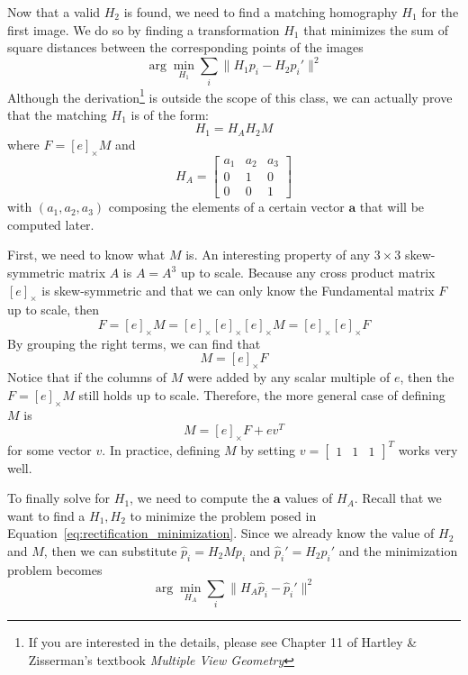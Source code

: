 \documentclass[a4paper, 12pt]{article}
\begin{document}
Now that a valid $H_2$ is found, we need to find a matching homography $H_1$ for the first image. We do so by finding a transformation $H_1$ that minimizes the sum of square distances between the corresponding points of the images
\begin{equation}
    \arg \min_{H_1} \sum_i \|H_1p_i - H_2 p_i'\|^2 
    \label{eq:rectification_minimization}
\end{equation}
Although the derivation\footnote{If you are interested in the details, please see Chapter 11 of Hartley \& Zisserman's textbook \textit{Multiple View Geometry}} is outside the scope of this class, we can actually prove that the matching $H_1$ is of the form:
\begin{equation}
    H_1 = H_A H_2 M
\label{eq:matching_homography}
\end{equation}
where $F= [e]_\times M$ and
\begin{equation}
    H_A = \begin{bmatrix} a_1 & a_2 & a_3\\ 0 & 1 & 0 \\ 0 & 0 &1\end{bmatrix}
\end{equation}
with $(a_1, a_2, a_3)$ composing the elements of a certain vector $\mathbf{a}$ that will be computed later. 

First, we need to know what $M$ is. An interesting property of any $3\times3$ skew-symmetric matrix $A$ is $A = A^3$ up to scale. Because any cross product matrix $[e]_\times$ is skew-symmetric and that we can only know the Fundamental matrix $F$ up to scale, then 
\begin{equation}
    F = [e]_\times M = [e]_\times [e]_\times [e]_\times M = [e]_\times [e]_\times F
\end{equation}
By grouping the right terms, we can find that 
\begin{equation}
    M = [e]_\times F
\end{equation}
Notice that if the columns of $M$ were added by any scalar multiple of $e$, then the $F = [e]_\times M$ still holds up to scale. Therefore, the more general case of defining $M$ is
\begin{equation}
    M = [e]_\times F + e v^T
\end{equation}
for some vector $v$. In practice, defining $M$ by setting $v=\begin{bmatrix}1 & 1 & 1\end{bmatrix}^T$ works very well.

To finally solve for $H_1$, we need to compute the $\mathbf{a}$ values of $H_A$. Recall that we want to find a $H_1, H_2$ to minimize the problem posed in Equation~\ref{eq:rectification_minimization}. Since we already know the value of $H_2$ and $M$, then we can substitute $\hat{p}_i = H_2Mp_i$ and $\hat{p}_i' = H_2p_i'$ and the minimization problem becomes
\begin{equation}
\arg \min_{H_A} \sum_i \|H_A\hat{p}_i - \hat{p}_i'\|^2 
\end{equation}
\end{document}
